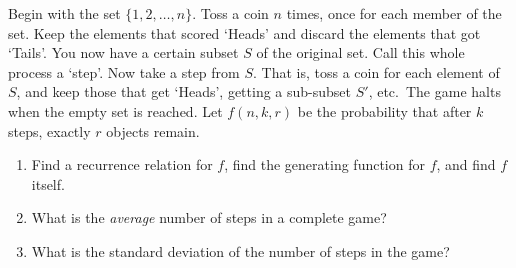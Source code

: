 \begin{exercise}
    Begin with the set $\{1, 2, \ldots, n\}$. Toss a coin $n$ times, once for each member of the set. Keep the elements that scored `Heads' and discard the elements that got `Tails'. You now have a certain subset $S$ of the original set. Call this whole process a `step'. Now take a step from $S$. That is, toss a coin for each element of $S$, and keep those that get `Heads', getting a sub-subset $S'$, etc.\ The game halts when the empty set is reached. Let $f(n,k,r)$ be the probability that after $k$ steps, exactly $r$ objects remain.
    \begin{enumerate}[label=(\alph*)]
        \item Find a recurrence relation for $f$, find the generating function for $f$, and find $f$ itself.
        \item What is the \emph{average} number of steps in a complete game?
        \item What is the standard deviation of the number of steps in the game?
    \end{enumerate}
\end{exercise}
